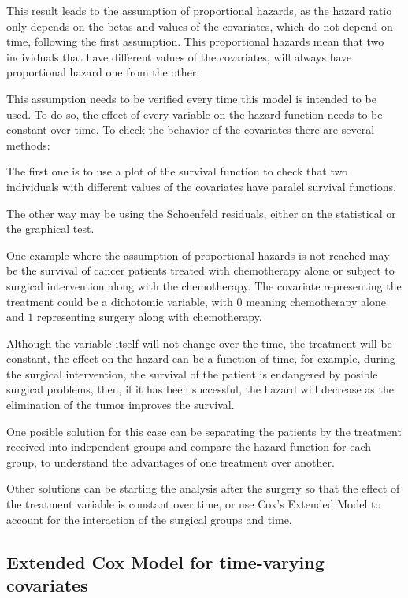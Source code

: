 \documentclass[11pt]{book} %
\begin{document}
      This result leads to the assumption of proportional hazards, as the hazard ratio only depends on the betas and values of the covariates, which do not depend on time, following the first assumption. This proportional hazards mean that two individuals that have different values of the covariates, will always have proportional hazard one from the other.

      This assumption needs to be verified every time this model is intended to be used. To do so, the effect of every variable on the hazard function needs to be constant over time. To check the behavior of the covariates there are several methods:

      The first one is to use a plot of the survival function to check that two individuals with different values of the covariates have paralel survival functions.

      The other way may be using the Schoenfeld residuals, either on the statistical or the graphical test.

      One example where the assumption of proportional hazards is not reached may be the survival of cancer patients treated with chemotherapy alone or subject to surgical intervention along with the chemotherapy. The covariate representing the treatment could be a dichotomic variable, with $0$ meaning chemotherapy alone and $1$ representing surgery along with chemotherapy.

      Although the variable itself will not change over the time, the treatment will be constant, the effect on the hazard can be a function of time, for example, during the surgical intervention, the survival of the patient is endangered by posible surgical problems, then, if it has been successful, the hazard will decrease as the elimination of the tumor improves the survival.

      One posible solution for this case can be separating the patients by the treatment received into independent groups and compare the hazard function for each group, to understand the advantages of one treatment over another.

      Other solutions can be starting the analysis after the surgery so that the effect of the treatment variable is constant over time, or use Cox's Extended Model to account for the interaction of the surgical groups and time.

    \subsection{Extended Cox Model for time-varying covariates}
\end{document}
